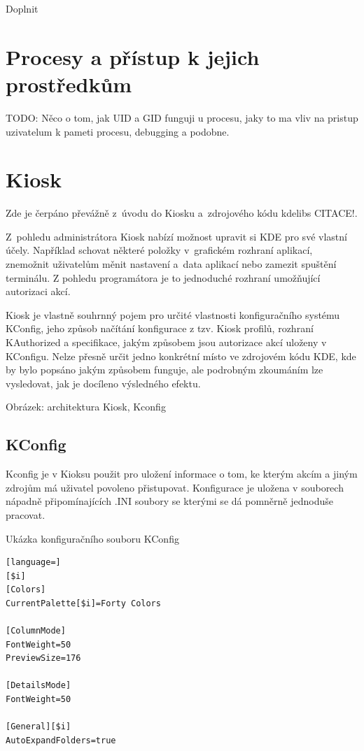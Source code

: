 Doplnit

\section{Procesy a přístup k jejich prostředkům}
TODO: Něco o tom, jak UID a GID funguji u procesu, jaky to ma vliv na pristup uzivatelum k pameti procesu, debugging a podobne.

\section{Kiosk}
Zde je čerpáno převážně z~úvodu do Kiosku \cite{Kioskintro} a~zdrojového kódu kdelibs CITACE!.

Z~pohledu administrátora Kiosk nabízí možnost upravit si KDE pro své vlastní účely. Například schovat některé položky v~grafickém rozhraní aplikací, znemožnit uživatelům měnit nastavení a~data aplikací nebo zamezit spuštění terminálu. Z pohledu programátora je to jednoduché rozhraní umožňující autorizaci akcí.

Kiosk je vlastně souhrnný pojem pro určité vlastnosti konfiguračního systému KConfig, jeho způsob načítání konfigurace z tzv. Kiosk profilů, rozhraní KAuthorized a specifikace, jakým způsobem jsou autorizace akcí uloženy v KConfigu. Nelze přesně určit jedno konkrétní místo ve zdrojovém kódu KDE, kde by bylo popsáno jakým způsobem funguje, ale podrobným zkoumáním lze vysledovat, jak je docíleno výsledného efektu.

Obrázek: architektura Kiosk, Kconfig

\subsection*{KConfig}
Kconfig je v Kioksu použit pro uložení informace o tom, ke kterým akcím a jiným zdrojům má uživatel povoleno přistupovat. Konfigurace je uložena v souborech nápadně připomínajících .INI soubory se kterými se dá pomněrně jednoduše pracovat.
\begin{mylisting}
\caption{Ukázka konfiguračního souboru KConfig}
\label{kconf_exmpl}
\begin{lstlisting}[language=]
[$i]
[Colors]
CurrentPalette[$i]=Forty Colors

[ColumnMode]
FontWeight=50
PreviewSize=176

[DetailsMode]
FontWeight=50

[General][$i]
AutoExpandFolders=true
\end{lstlisting}
\end{mylisting}

